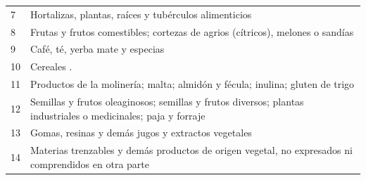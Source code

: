 \documentclass[a4paper,openright,12pt]{book}
\begin{document}
\begin{table}[]
{\begin{tabular}{@{}ll@{}}
7   & Hortalizas, plantas, raíces y tubérculos alimenticios                                                                                                                                                                                                                                          \\
8   & Frutas y frutos comestibles; cortezas de agrios (cítricos), melones o sandías                                                                                                                                                                                                                  \\
9   & Café, té, yerba mate y especias                                                                                                                                                                                                                                                                \\
10  & Cereales .                                                                                                                                                                                                                                                                                     \\
11  & Productos de la molinería; malta; almidón y fécula; inulina; gluten de trigo                                                                                                                                                                                                                   \\
12  & Semillas y frutos oleaginosos; semillas y frutos diversos; plantas industriales o medicinales; paja y forraje                                                                                                                                                                                  \\
13  & Gomas, resinas y demás jugos y extractos vegetales                                                                                                                                                                                                                                             \\
14  & Materias trenzables y demás productos de origen vegetal, no expresados ni comprendidos en otra parte                                                                                                                                                                                           \\

\end{tabular}}
\end{table}
\end{document}
